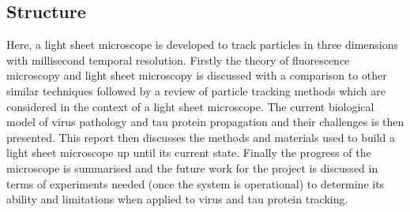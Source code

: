 %
%
%
%
%
%
%
%
%
%
%



\subsection{Structure}

Here, a light sheet microscope is developed to track particles in three dimensions with millisecond temporal resolution. Firstly the theory of fluorescence microscopy and light sheet microscopy is discussed with a comparison to other similar techniques followed by a review of particle tracking methods which are considered in the context of a light sheet microscope. The current biological model of virus pathology and tau protein propagation and their challenges is then presented. This report then discusses the methods and materials used to build a light sheet microscope up until its current state. Finally the progress of the microscope is summarised and the future work for the project is discussed in terms of experiments needed (once the system is operational) to determine its ability and limitations when applied to virus and tau protein tracking.

